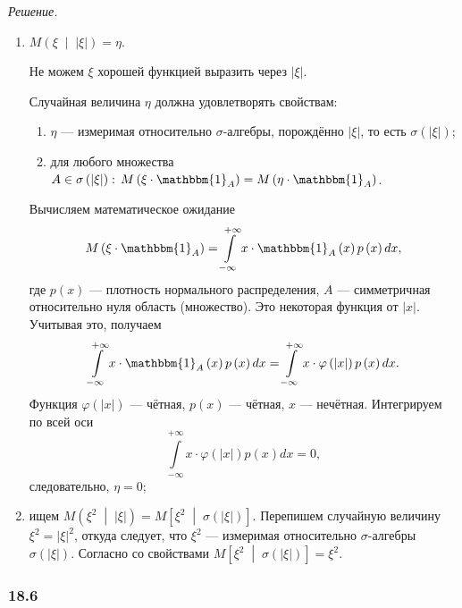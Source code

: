 \textit{Решение.}
\begin{enumerate}[label=\alph*)]
  \item $M \left( \xi \; \middle| \; \left| \xi \right| \right) =
    \eta $.

  Не можем $ \xi $ хорошей функцией выразить через $ \left| \xi \right| $.

  Случайная величина $ \eta $ должна удовлетворять свойствам:
  \begin{enumerate}
    \item $ \eta $ --- измеримая относительно $ \sigma $-алгебры, порождённо $ \left| \xi \right| $,
    то есть $ \sigma \left( \left| \xi \right| \right) $;
    \item для любого множества
    $A \in \sigma \left( \left| \xi \right| \right): \,
    M \left( \xi \cdot \mathbbm{1}_A \right) = M \left( \eta \cdot \mathbbm{1}_A \right) $.
  \end{enumerate}

  Вычисляем математическое ожидание
  $$M \left( \xi \cdot \mathbbm{1}_A \right) =
    \int \limits_{- \infty }^{+ \infty }
      x \cdot \mathbbm{1}_A \left( x \right) p \left( x \right) dx,$$
  где $p \left( x \right) $ --- плотность нормального распределения, $A$ ---
  симметричная относительно нуля область (множество).
  Это некоторая функция от $ \left| x \right| $.
  Учитывая это, получаем
  $$ \int \limits_{- \infty }^{+ \infty }
      x \cdot \mathbbm{1}_A \left( x \right) p \left( x \right) dx =
    \int \limits_{- \infty }^{+ \infty }
      x \cdot \varphi \left( \left| x \right| \right) p \left( x \right) dx.$$
  Функция $ \varphi \left( \left| x \right| \right) $ --- чётная, $p \left( x \right) $ --- чётная,
  $x$ --- нечётная.
  Интегрируем по всей оси
  $$ \int \limits_{- \infty }^{+ \infty }
      x \cdot \varphi \left( \left| x \right| \right) p \left( x \right) dx =
    0,$$
  следовательно, $ \eta = 0$;

  \item ищем
  $M \left( \xi^2 \; \middle| \; \left| \xi \right| \right) =
    M \left[ \xi^2 \; \middle| \; \sigma \left( \left| \xi \right| \right) \right] $.
  Перепишем случайную величину $ \xi^2 = \left| \xi \right|^2$, откуда следует, что $ \xi^2$ ---
  измеримая относительно $ \sigma $-алгебры $ \sigma \left( \left| \xi \right| \right) $.
  Согласно со свойствами
  $M \left[ \xi^2 \; \middle| \; \sigma \left( \left| \xi \right| \right) \right] =
    \xi^2.$
\end{enumerate}

\subsubsection*{18.6}

